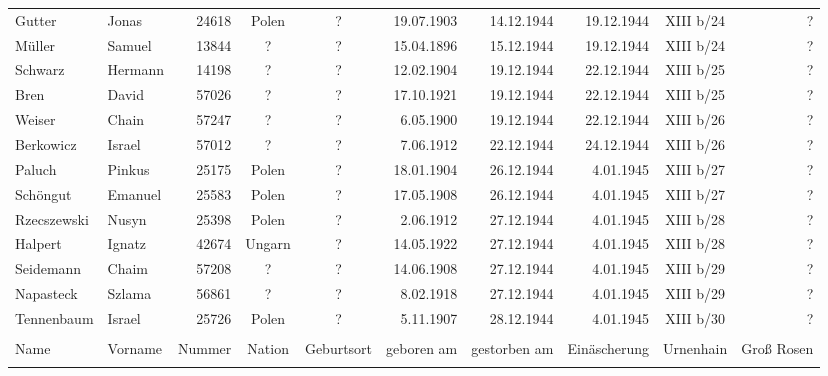 \begin{tiny}
\begin{longtable}[l]{|l|l|r|c|c|r|r|r|c|r|}
Gutter  &  Jonas  & 24618 &  Polen  &  ?  & 19.07.1903 & 14.12.1944 & 19.12.1944 &  XIII b/24  &  ? \\[3pt]
Müller  &  Samuel  & 13844 &  ?  &  ?  & 15.04.1896 & 15.12.1944 & 19.12.1944 &  XIII b/24  &  ? \\[3pt]
Schwarz  &  Hermann  & 14198 &  ?  &  ?  & 12.02.1904 & 19.12.1944 & 22.12.1944 &  XIII b/25  &  ? \\[3pt]
Bren  &  David  & 57026 &  ?  &  ?  & 17.10.1921 & 19.12.1944 & 22.12.1944 &  XIII b/25  &  ? \\[3pt]
Weiser  &  Chain  & 57247 &  ?  &  ?  & 6.05.1900 & 19.12.1944 & 22.12.1944 &  XIII b/26  &  ? \\[3pt]
Berkowicz  &  Israel  & 57012 &  ?  &  ?  & 7.06.1912 & 22.12.1944 & 24.12.1944 &  XIII b/26  &  ? \\[3pt]
Paluch  &  Pinkus  & 25175 &  Polen  &  ?  & 18.01.1904 & 26.12.1944 & 4.01.1945 &  XIII b/27  &  ? \\[3pt]
Schöngut  &  Emanuel  & 25583 &  Polen  &  ?  & 17.05.1908 & 26.12.1944 & 4.01.1945 &  XIII b/27  &  ? \\[3pt]
Rzecszewski  &  Nusyn  & 25398 &  Polen  &  ?  & 2.06.1912 & 27.12.1944 & 4.01.1945 &  XIII b/28  &  ? \\[3pt]
Halpert  &  Ignatz  & 42674 &  Ungarn  &  ?  & 14.05.1922 & 27.12.1944 & 4.01.1945 &  XIII b/28  &  ? \\[3pt]
Seidemann  &  Chaim  & 57208 &  ?  &  ?  & 14.06.1908 & 27.12.1944 & 4.01.1945 &  XIII b/29  &  ? \\[3pt]
Napasteck  &  Szlama  & 56861 &  ?  &  ?  & 8.02.1918 & 27.12.1944 & 4.01.1945 &  XIII b/29  &  ? \\[3pt]
Tennenbaum  &  Israel  & 25726 &  Polen  &  ?  & 5.11.1907 & 28.12.1944 & 4.01.1945 &  XIII b/30  &  ? \\[3pt]

\hline\pagebreak\hline  & \\[-9pt]
Name  &  Vorname  &  Nummer  &  Nation  &  Geburtsort  &  geboren am  &  gestorben am  &  Einäscherung  &  Urnenhain  &  Groß Rosen \\[3pt]
\hline  & \\[-9pt]


\end{longtable}
\end{tiny}
